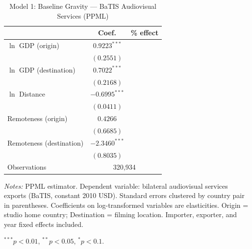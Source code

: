 \begin{table}[htbp]
\centering
\caption{Model 1: Baseline Gravity --- BaTIS Audiovisual Services (PPML)}
\label{tab:batis_model1}
\small
\begin{tabular}{l cc}
\toprule
 & Coef. & \% effect \\
\midrule
$\ln$ GDP (origin) & $0.9223^{***}$ & \\
 & $(0.2551)$ & \\[4pt]
$\ln$ GDP (destination) & $0.7022^{***}$ & \\
 & $(0.2168)$ & \\[4pt]
$\ln$ Distance & $-0.6995^{***}$ & \\
 & $(0.0411)$ & \\[4pt]
Remoteness (origin) & $0.4266$ & \\
 & $(0.6685)$ & \\[4pt]
Remoteness (destination) & $-2.3460^{***}$ & \\
 & $(0.8035)$ & \\[4pt]
\midrule
Observations & \multicolumn{2}{c}{320,934} \\
\bottomrule
\end{tabular}
\par\vspace{4pt}\noindent\begin{minipage}{\textwidth}
\footnotesize
\par \textit{Notes:} PPML estimator. Dependent variable: bilateral audiovisual services exports (BaTIS, constant 2010 USD). Standard errors clustered by country pair in parentheses. Coefficients on log-transformed variables are elasticities. Origin = studio home country; Destination = filming location. Importer, exporter, and year fixed effects included.
\par $^{***}p<0.01$, $^{**}p<0.05$, $^{*}p<0.1$.
\end{minipage}
\end{table}

\clearpage


